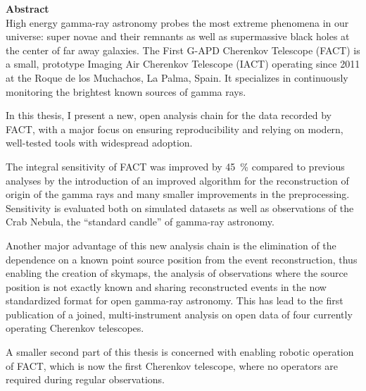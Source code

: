 \noindent\textbf{\sffamily\Large Abstract}\\[0.5\baselineskip]
High energy gamma-ray astronomy probes the most extreme phenomena in our universe:
super novae and their remnants as well as supermassive  black holes at the center
of far away galaxies.
The First G-APD Cherenkov Telescope (FACT) is a small, prototype Imaging Air Cherenkov Telescope (IACT)
operating since 2011 at the Roque de los Muchachos, La Palma, Spain. 
It specializes in continuously monitoring the brightest known sources of gamma rays.

In this thesis, I present a new, open analysis chain for the data recorded by FACT,
with a major focus on ensuring reproducibility and relying on modern,
well-tested tools with widespread adoption.

The integral sensitivity of FACT was improved by \SI{45}{\percent} compared to previous analyses
by the introduction of an improved algorithm for the reconstruction of
origin of the gamma rays and many smaller improvements in the preprocessing.
Sensitivity is evaluated both on simulated datasets as well as observations of the Crab Nebula,
the \enquote{standard candle} of gamma-ray astronomy.  

Another major advantage of this new analysis chain is the elimination of
the dependence on a known point source position from the event reconstruction,
thus enabling the creation of skymaps, the analysis of observations where the source position is not exactly known
and sharing reconstructed events in the now standardized format for open gamma-ray astronomy.
This has lead to the first publication of a joined, multi-instrument analysis on open data
of four currently operating Cherenkov telescopes.

A smaller second part of this thesis is concerned with enabling 
robotic operation of FACT, which is now the first Cherenkov telescope,
where no operators are required during regular observations.

